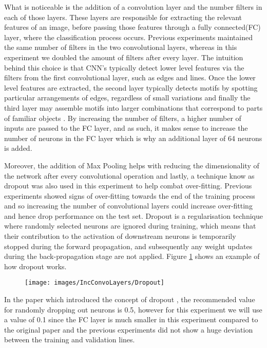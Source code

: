 What is noticeable is the addition of a convolution layer and the number filters in each of those layers. These layers are responsible for extracting the relevant features of an image, before passing those features through a fully connected(FC) layer, where the classification process occurs. Previous experiments maintained the same number of filters in the two convolutional layers, whereas in this experiment we doubled the amount of filters after every layer. The intuition behind this choice is that CNN's typically detect lower level features via the filters from the first convolutional layer, such as edges and lines. Once the lower level features are extracted, the second layer typically detects motifs by spotting particular arrangements of edges, regardless of small variations and finally the third layer may assemble motifs into larger combinations that correspond to parts of familiar objects \cite{lecun2015deep}. By increasing the number of filters, a higher number of inputs are passed to the FC layer, and as such, it makes sense to increase the number of neurons in the FC layer which is why an additional layer of 64 neurons is added. 

Moreover, the addition of Max Pooling helps with reducing the dimensionality of the network after every convolutional operation and lastly, a technique know as dropout was also used in this experiment to help combat over-fitting. Previous experiments showed signs of over-fitting towards the end of the training process and so increasing the number of convolutional layers could increase over-fitting and hence drop performance on the test set. Dropout is a regularisation technique where randomly selected neurons are ignored during training, which means that their contribution to the activation of downstream neurons is temporarily stopped during the forward propagation, and subsequently any weight updates during the back-propagation stage are not applied. Figure \ref{fig:Dropout} shows an example of how dropout works.

\begin{figure}[H]
	\centering
	\texttt{[image: images/IncConvoLayers/Dropout]}
	\caption{}
	\label{fig:Dropout}
\end{figure}

In the paper which introduced the concept of dropout \cite{srivastava2014dropout}, the recommended value for randomly dropping out neurons is 0.5, however for this experiment we will use a value of 0.1 since the FC layer is much smaller in this experiment compared to the original paper and the previous experiments did not show a huge deviation between the training and validation lines.

